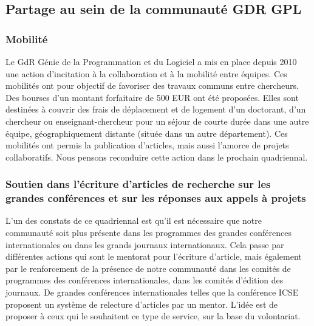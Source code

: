 \documentclass[11pt]{article}
\newcommand{\mynote}[3][black]{\textcolor{#1}{\fbox{\bfseries\sffamily\scriptsize{#2}}
{\small$\blacktriangleright$\textsf{\emph{#3}}$\blacktriangleleft$}}}
\newcommand{\pem}[1]{} %
\begin{document}
\subsection{Partage au sein de la communauté GDR GPL}

\subsubsection{Mobilité}

Le GdR Génie de la Programmation et du Logiciel a mis en place depuis 2010 une action d'incitation à la collaboration et à la mobilité entre équipes. Ces mobilités ont pour objectif de favoriser des travaux communs
entre chercheurs. Des bourses d'un montant forfaitaire de 500 EUR  ont été proposées. Elles sont destinées à couvrir des frais de déplacement et de logement d'un doctorant, d'un chercheur ou enseignant-chercheur pour un séjour de courte durée dans une autre équipe, géographiquement distante (située dans un autre département). Ces mobilités ont permis la publication d'articles, mais aussi l'amorce de projets collaboratifs. Nous pensons reconduire cette action dans le prochain quadriennal.

\subsubsection{Soutien dans l'écriture d'articles de recherche sur les grandes conférences et sur les réponses aux appels à projets}

L'un des constats de ce quadriennal est qu'il est nécessaire que notre communauté soit plus présente dans les programmes des grandes conférences internationales ou dans les grands journaux internationaux. Cela passe par différentes actions qui sont le mentorat pour l'écriture d'article, mais également par le renforcement de la présence de notre communauté dans les comités de programmes des conférences internationales, dans les comités d'édition des journaux. De grandes conférences internationales telles que la conférence ICSE proposent un système de relecture d'articles par un mentor. L'idée est de proposer à ceux qui le souhaitent ce type de service, sur la base du volontariat.

\end{document}
